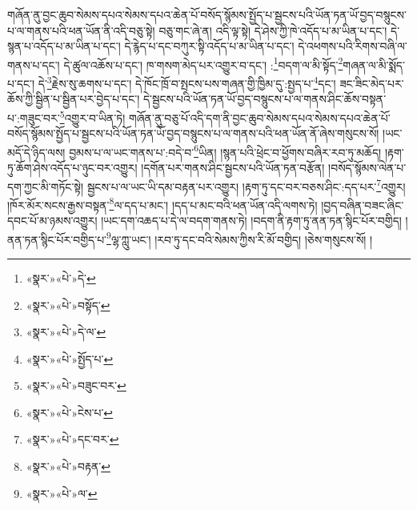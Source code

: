 གཞོན་ནུ་བྱང་ཆུབ་སེམས་དཔའ་སེམས་དཔའ་ཆེན་པོ་བསོད་སྙོམས་སྤྱོད་པ་སྦྱངས་པའི་ཡོན་ཏན་ཡོ་བྱད་བསྙུངས་པ་ལ་གནས་པའི་ཕན་ཡོན་ནི་འདི་བཅུ་སྟེ། བཅུ་གང་ཞེ་ན། འདི་ལྟ་སྟེ། དེ་ཤེས་ཀྱི་ཁེ་འདོད་པ་མ་ཡིན་པ་དང་། དེ་སྙན་པ་འདོད་པ་མ་ཡིན་པ་དང་། དེ་རྙེད་པ་དང་བཀུར་སྟི་འདོད་པ་མ་ཡིན་པ་དང་། དེ་འཕགས་པའི་རིགས་བཞི་ལ་གནས་པ་དང་། དེ་ཚུལ་འཆོས་པ་དང་། ཁ་གསག་མེད་པར་འགྱུར་བ་དང་། :\footnote{«སྣར་»«པེ་»དེ་}བདག་ལ་མི་སྟོད་\footnote{«སྣར་»«པེ་»བསྟོད་}གཞན་ལ་མི་སྨོད་པ་དང་། དེ་\footnote{«སྣར་»«པེ་»དེ་ལ་}རྗེས་སུ་ཆགས་པ་དང་། དེ་ཁོང་ཁྲོ་བ་སྤངས་པས་གཞན་གྱི་ཁྱིམ་དུ་:སྤྱད་པ་\footnote{«སྣར་»«པེ་»སྤྱོད་པ་}དང་། ཟང་ཟིང་མེད་པར་ཆོས་ཀྱི་སྦྱིན་པ་སྦྱིན་པར་བྱེད་པ་དང་། དེ་སྦྱངས་པའི་ཡོན་ཏན་ཡོ་བྱད་བསྙུངས་པ་ལ་གནས་ཤིང་ཆོས་བསྟན་པ་:གཟུང་བར་\footnote{«སྣར་»«པེ་»བཟུང་བར་}འགྱུར་བ་ཡིན་ཏེ། གཞོན་ནུ་བཅུ་པོ་འདི་དག་ནི་བྱང་ཆུབ་སེམས་དཔའ་སེམས་དཔའ་ཆེན་པོ་བསོད་སྙོམས་སྤྱོད་པ་སྦྱངས་པའི་ཡོན་ཏན་ཡོ་བྱད་བསྙུངས་པ་ལ་གནས་པའི་ཕན་ཡོན་ནོ་ཞེས་གསུངས་སོ། །ཡང་མདོ་དེ་ཉིད་ལས། བྱམས་པ་ལ་ཡང་གནས་པ་:བདེ་བ་\footnote{«སྣར་»«པེ་»ངེས་པ་}ཡིན། །སྙན་པའི་ཕྲེང་བ་ཕྱོགས་བཞིར་རབ་ཏུ་མཆོད། །རྟག་ཏུ་ཆོག་ཤེས་འདོད་པ་ཉུང་བར་འགྱུར། །དགོན་པར་གནས་ཤིང་སྦྱངས་པའི་ཡོན་ཏན་བརྩོན། །བསོད་སྙོམས་ལེན་པ་དག་ཀྱང་མི་གཏོང་སྟེ། སྦྱངས་པ་ལ་ཡང་ཡི་དམ་བརྟན་པར་འགྱུར། །རྟག་ཏུ་དང་བར་བཅས་ཤིང་:དད་པར་\footnote{«སྣར་»«པེ་»དང་བར་}འགྱུར། །ཁོར་མོར་སངས་རྒྱས་བསྟན་\footnote{«སྣར་»«པེ་»བརྟན་}ལ་དད་པ་མང་། །དད་པ་མང་བའི་ཕན་ཡོན་འདི་ལགས་ཏེ། །བྱད་བཞིན་བཟང་ཞིང་དབང་པོ་མ་ཉམས་འགྱུར། །ཡང་དག་འཆད་པ་དེ་ལ་བདག་གནས་ཏེ། །བདག་ནི་རྟག་ཏུ་ནན་ཏན་སྙིང་པོར་བགྱིད། །ནན་ཏན་སྙིང་པོར་བགྱིད་པ་\footnote{«སྣར་»«པེ་»ལ་}ལྷ་ཀླུ་ཡང་། །རབ་ཏུ་དང་བའི་སེམས་ཀྱིས་རི་མོ་བགྱིད། །ཅེས་གསུངས་སོ། །
